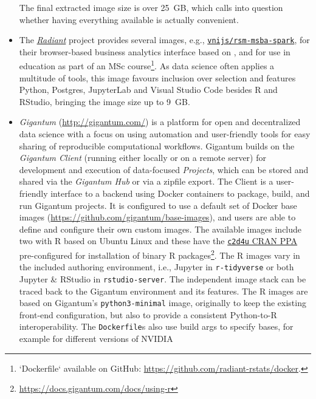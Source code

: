 \begin{itemize}
  The final extracted image size is over 25~GB, which calls into
  question whether having everything available is actually convenient. 
\item
  The \href{https://radiant-rstats.github.io/docs/}{\emph{Radiant}}
  project provides several images, e.g.,
  \href{https://hub.docker.com/r/vnijs/rsm-msba-spark}{\texttt{vnijs/rsm-msba-spark}},
  for their browser-based business analytics interface based on
   \citep{cran_shiny}, and for use in education as part
  of an MSc
  course\footnote{`Dockerfile` available on GitHub: \href{https://github.com/radiant-rstats/docker}{https://github.com/radiant-rstats/docker}.}.
  As data science often applies a multitude of tools, this image favours
  inclusion over selection and features Python, Postgres, JupyterLab and
  Visual Studio Code besides R and RStudio, bringing the image size up
  to 9~GB.
\item
  \emph{Gigantum} (\url{http://gigantum.com/}) is a platform for open
  and decentralized data science with a focus on using automation and
  user-friendly tools for easy sharing of reproducible computational
  workflows. Gigantum builds on the \emph{Gigantum Client} (running
  either locally or on a remote server) for development and execution of
  data-focused \emph{Projects}, which can be stored and shared via the
  \emph{Gigantum Hub} or via a zipfile export. The Client is a
  user-friendly interface to a backend using Docker containers to
  package, build, and run Gigantum projects. It is configured to use a
  default set of Docker base images
  (\url{https://github.com/gigantum/base-images}), and users are able to
  define and configure their own custom images. The available images
  include two with R based on Ubuntu Linux and these have the
  \href{https://launchpad.net/~marutter/+archive/ubuntu/c2d4u3.5/}{\texttt{c2d4u}
  CRAN PPA} pre-configured for installation of binary R
  packages\footnote{\href{https://docs.gigantum.com/docs/using-r}{https://docs.gigantum.com/docs/using-r}}.
  The R images vary in the included authoring environment, i.e., Jupyter
  in \texttt{r-tidyverse} or both Jupyter \& RStudio in
  \texttt{rstudio-server}. The independent image stack can be traced
  back to the Gigantum environment and its features. The R images are
  based on Gigantum's \texttt{python3-minimal} image, originally to keep
  the existing front-end configuration, but also to provide a consistent
  Python-to-R interoperability. The \texttt{Dockerfile}s also use build
  args to specify bases, for example for different versions of NVIDIA

\end{itemize}
